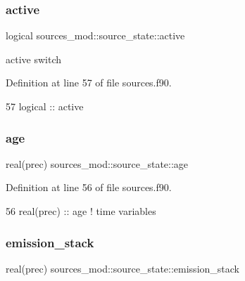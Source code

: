 \subsubsection{\texorpdfstring{active}{active}}
{\footnotesize\ttfamily logical sources\+\_\+mod\+::source\+\_\+state\+::active\hspace{0.3cm}{\ttfamily [private]}}



active switch 



Definition at line 57 of file sources.\+f90.


\begin{DoxyCode}
57         \textcolor{keywordtype}{logical} :: active
\end{DoxyCode}
\mbox{\label{structsources__mod_1_1source__state_a60a0c06c969401978a8cd13b4682fe1c}} 
\subsubsection{\texorpdfstring{age}{age}}
{\footnotesize\ttfamily real(prec) sources\+\_\+mod\+::source\+\_\+state\+::age\hspace{0.3cm}{\ttfamily [private]}}



Definition at line 56 of file sources.\+f90.


\begin{DoxyCode}
56         \textcolor{keywordtype}{real(prec)} :: age                   \textcolor{comment}{! time variables}
\end{DoxyCode}
\mbox{\label{structsources__mod_1_1source__state_a8c705a419fbe999e624ac42ae586700a}} 
\subsubsection{\texorpdfstring{emission\+\_\+stack}{emission\_stack}}
{\footnotesize\ttfamily real(prec) sources\+\_\+mod\+::source\+\_\+state\+::emission\+\_\+stack\hspace{0.3cm}{\ttfamily [private]}}



